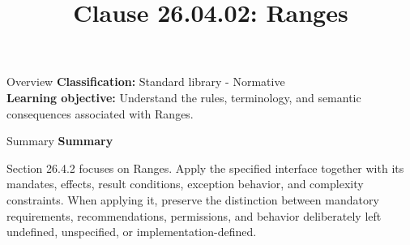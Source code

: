 \documentclass[10pt,letterpaper]{article}
\title{Clause 26.04.02: Ranges}
\author{}
\date{}
\begin{document}
\maketitle
\begin{CornellOverviewBox}{Overview}
\textbf{Classification:} Standard library - Normative\\[2pt]
\textbf{Learning objective:} Understand the rules, terminology, and semantic consequences associated with Ranges.
\end{CornellOverviewBox}\begin{CornellSummaryBox}{Summary}
{\sffamily\bfseries\color{Accent} Summary}\par\vspace{3pt}Section 26.4.2 focuses on Ranges. Apply the specified interface together with its mandates, effects, result conditions, exception behavior, and complexity constraints. When applying it, preserve the distinction between mandatory requirements, recommendations, permissions, and behavior deliberately left undefined, unspecified, or implementation-defined.
\end{CornellSummaryBox}
\end{document}

